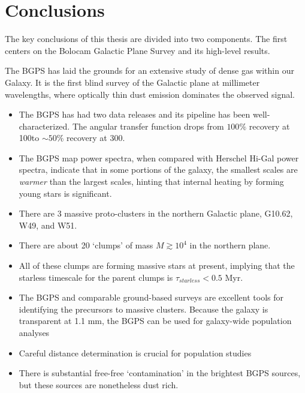 
\chapter{Conclusions}
\label{ch:conclusion}
The key conclusions of this thesis are divided into two components.  The first
centers on the Bolocam Galactic Plane Survey and its high-level results.

The BGPS has laid the grounds for an extensive study of dense gas within our
Galaxy.  It is the first blind survey of the Galactic plane at millimeter
wavelengths, where optically thin dust emission dominates the observed signal.

\begin{itemize}
    \item The BGPS has had two data releases and its
        pipeline has been well-characterized.  The angular transfer function drops
        from $100\%$ recovery at 100\arcsec to $\sim50\%$ recovery at 300\arcsec.
    \item The BGPS map power spectra, when compared with Herschel Hi-Gal power
        spectra, indicate that in some portions of the galaxy, the smallest
        scales are \emph{warmer} than the largest scales, hinting that internal
        heating by forming young stars is significant.
    \item There are 3 massive proto-clusters in the northern Galactic plane, 
        G10.62, W49, and W51.
    \item There are about 20 `clumps' of mass $M\gtrsim10^4$ \msun in the northern
        plane.
    \item All of these clumps are forming massive stars at present, implying that
        the starless timescale for the parent clumps is $\tau_{starless}<0.5$ Myr.
    \item The BGPS and comparable ground-based surveys are excellent tools for
        identifying the precursors to massive clusters.  Because the galaxy is transparent
        at 1.1 mm, the BGPS can be used for galaxy-wide population analyses
    \item Careful distance determination is crucial for population studies
    \item There is substantial free-free `contamination' in the brightest BGPS
        sources, but these sources are nonetheless dust rich.
\end{itemize}



